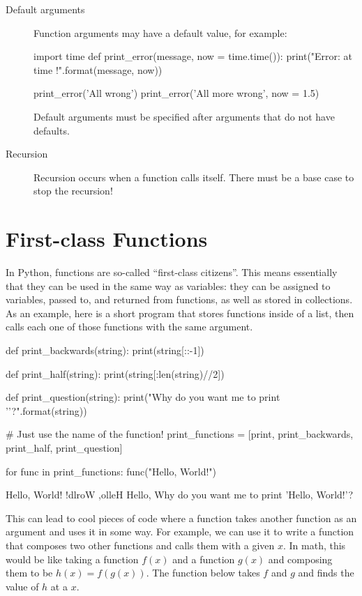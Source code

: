 \documentclass[11pt]{cselabheader}
\begin{document}
\begin{description}
\item[Default arguments] Function arguments may have a default value, for
    example:
    \begin{python3code}
import time
def print_error(message, now = time.time()):
  print("Error: {} at time {}!".format(message, now))

print_error('All wrong')
print_error('All more wrong', now = 1.5)
    \end{python3code}

    Default arguments must be specified after arguments that do not have
    defaults.

  \item[Recursion] Recursion occurs when a function calls itself. There must be
    a base case to stop the recursion!
\end{description}

\pagebreak
\section{First-class Functions}
\label{subsec:first}
In Python, functions are so-called ``first-class citizens''. This means
essentially that they can be used in the same way as variables: they can be
assigned to variables, passed to, and returned from functions, as well as stored
in collections. As an example, here is a short program that stores functions
inside of a list, then calls each one of those functions with the same argument.

\begin{python3code}
def print_backwards(string):
    print(string[::-1])

def print_half(string):
    print(string[:len(string)//2])

def print_question(string):
    print("Why do you want me to print '{}'?".format(string))

# Just use the name of the function!
print_functions = [print, print_backwards, print_half, print_question]

for func in print_functions:
    func("Hello, World!")
\end{python3code}

\begin{verbatimcode}
Hello, World!
!dlroW ,olleH
Hello,
Why do you want me to print 'Hello, World!'?
\end{verbatimcode}

This can lead to cool pieces of code where a function takes another function as
an argument and uses it in some way. For example, we can use it to write a
function that composes two other functions and calls them with a given $x$. In
math, this would be like taking a function $f(x)$ and a function $g(x)$ and
composing them to be $h(x) = f(g(x))$. The function below takes $f$ and $g$ and
finds the value of $h$ at a $x$.
\end{document}
